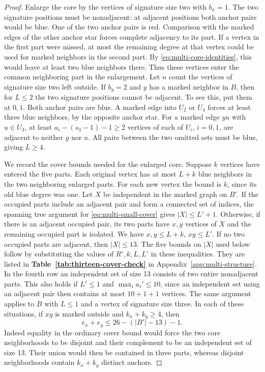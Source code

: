 \documentclass[preprint,11pt,numbers]{elsarticle-arxiv}
\numberwithin{equation}{section}
\theoremstyle{definition}
\begin{document}
\begin{proof}
Enlarge the core by the vertices of signature size two with $b_x=1$.
The two signature positions must be nonadjacent: at adjacent positions
both anchor pairs would be blue. One of the two anchor pairs is red.
Comparison with the marked edges of the other anchor star forces
complete adjacency to its part. If a vertex in the first part were
missed, at most the remaining degree at that vertex could be used
for marked neighbors in the second part. By
\eqref{eq:multi-core-identities}, this would leave at least two blue
neighbors there. Thus these vertices enter the common neighboring part in the enlargement.
Let $n$ count the vertices of signature size two left outside.
If $b_y=2$ and $y$ has a marked neighbor in $B$, then for $L\le2$
the two signature positions cannot be adjacent. To see this, put them
at $0,1$. Both anchor pairs are blue. A marked edge into $U_2$ or
$U_4$ forces at least three blue neighbors, by the opposite anchor
star. For a marked edge $yu$ with $u\in U_3$, at least
$a_i-(s_3-1)-1\ge2$ vertices of each of $U_i$, $i=0,1$, are
adjacent to neither $y$ nor $u$. All pairs between the two omitted
sets must be blue, giving $L\ge4$.

We record the cover bounds needed for the enlarged core. Suppose
$k$ vertices have entered the five parts. Each original vertex has
at most $L+k$ blue neighbors in the two neighboring enlarged parts.
For each new vertex the bound is $k$, since its old blue degree was
one. Let $X$ be independent in the marked graph on $B'$. If the
occupied parts include an adjacent pair and form a connected set of
indices, the spanning tree argument for \eqref{eq:multi-small-cover}
gives $|X|\le L'+1$. Otherwise, if there is an adjacent occupied
pair, its two parts have $x,y$ vertices of $X$ and the remaining
occupied part is isolated. We have $x,y\le L+k$, $xy\le L'$.
If no two occupied parts are adjacent, then $|X|\le13$.
The five bounds on $|X|$ used below follow by substituting
the values of $R',k,L,L'$ in these inequalities. They are listed in
\textbf{Table~\ref{tab:thirteen-cover-check}} in Appendix~\ref{app:multi-structure}.
In the fourth row an independent set of size 13 consists of two entire
nonadjacent parts. This also
holds if $L'\le1$ and $\max_i a_i'\le10$, since an independent set
using an adjacent pair then contains at most $10+1+1$ vertices.
The same argument applies to $B$ with $L\le1$ and a vertex of
signature size three. In each of these situations, if $xy$ is marked
outside and $k_x+k_y\ge4$, then
\begin{equation}\label{eq:d13-improved-cover}
 e_x+e_y\le 26-(|B'|-13)-1.
\end{equation}
Indeed equality in the ordinary cover bound would force the two core
neighborhoods to be disjoint and their complement to be an independent
set of size 13. Their union would then be contained in three parts,
whereas disjoint neighborhoods contain $k_x+k_y$ distinct anchors.


\end{proof}
\end{document}
